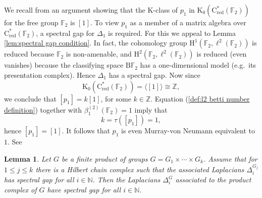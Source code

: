 \documentclass[a4paper,leqno,12pt]{article}
\numberwithin{equation}{section}
\theoremstyle{plain}
\newtheorem{lemma}[theoremcounter]{Lemma}
\theoremstyle{definition}
\theoremstyle{remark}
\newcommand{\Csr}{\mathrm{C}^*_{\text{red}}}
\begin{document}
	We recall from \cite[Example 1.5.1]{linowakpooya2020} an argument showing that the K-class of $p_1$ in $\mathrm K_0(\Csr(\mathbb F_2))$ for the free group $\mathbb F_2$ is $[1]$. To view $p_1$ as a member of a matrix algebra over $\Csr(\mathbb F_2)$, a spectral gap for $\Delta_1$ is required.	For this we appeal to Lemma \ref{lem:spectral gap condition}. In fact,
	the cohomology group $\mathrm H^1(\mathbb F_2, \ell^ 2 (\mathbb F_2))$ is reduced because $\mathbb F_2$ is non-amenable, and
	$\mathrm H^2(\mathbb F_2, \ell^ 2 (\mathbb F_2))$ is reduced (even vanishes) because the classifying space $\mathrm{B}\mathbb F_2$ has a one-dimensional model (e.g.\ its presentation complex). Hence $\Delta_1$ has a spectral gap.
	Now since 
	$$\mathrm K_0(\Csr (\mathbb F_2)) =  \langle{[1]}\rangle \cong \mathbb Z,$$ we conclude that $[p_1] = k [1]$, for some $k\in \mathbb Z$. 
	Equation 
	(\ref{def:l2 betti number definition}) together with $\beta^{(2)}_ 1(\mathbb F_2)=1$ imply that 
	$$k=\tau([p_1]) =1,$$ 
	hence $[p_1] = [1]$. It follows that $p_1$ is even Murray-von Neumann equivalent to $1$.  See \cite{dykemahaageruprordam1997}

	
	\begin{lemma}\label{lem:spectral gap for productof groups}
		Let $G$ be a finite product of groups $G = G_1 \times \cdots \times G_k$. Assume that for $1\leq j \leq k$ there is a Hilbert chain complex such that the associated Laplacians $\Delta_i^{G_j}$ has spectral gap for all $i\in \mathbb N$. Then the Laplacians $\Delta_i ^{G}$ associated to the product complex of $G$ have spectral gap for all $i\in \mathbb N$.
		
		
	\end{lemma}
\end{document}
